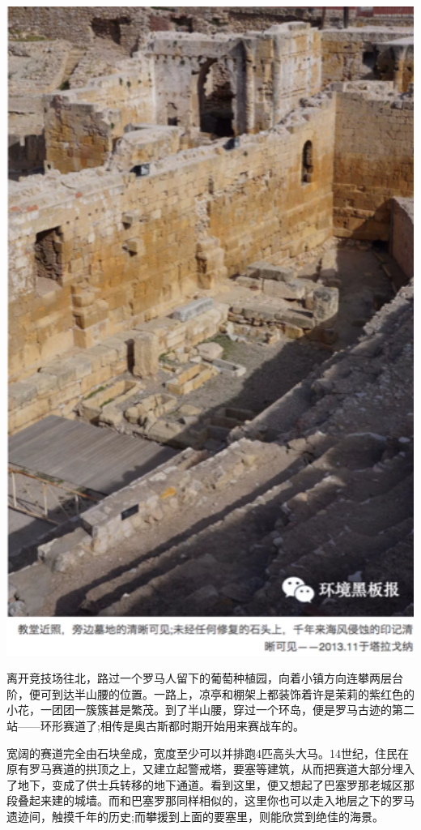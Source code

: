 \documentclass[
]{book}
\begin{document}
\includegraphics[width=5.24in]{images/xt31}

离开竞技场往北，路过一个罗马人留下的葡萄种植园，向着小镇方向连攀两层台阶，便可到达半山腰的位置。一路上，凉亭和棚架上都装饰着许是茉莉的紫红色的小花，一团团一簇簇甚是繁茂。到了半山腰，穿过一个环岛，便是罗马古迹的第二站------环形赛道了;相传是奥古斯都时期开始用来赛战车的。

宽阔的赛道完全由石块垒成，宽度至少可以并排跑4匹高头大马。14世纪，住民在原有罗马赛道的拱顶之上，又建立起警戒塔，要塞等建筑，从而把赛道大部分埋入了地下，变成了供士兵转移的地下通道。看到这里，便又想起了巴塞罗那老城区那段叠起来建的城墙。而和巴塞罗那同样相似的，这里你也可以走入地层之下的罗马遗迹间，触摸千年的历史;而攀援到上面的要塞里，则能欣赏到绝佳的海景。
\end{document}
